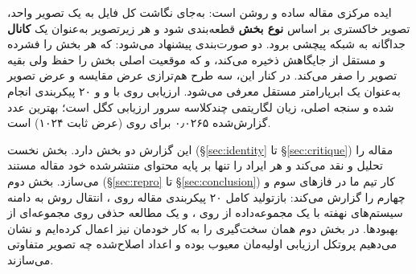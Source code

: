 ایده مرکزی مقاله ساده و روشن است: به‌جای نگاشت کل فایل به یک تصویر واحد، تصویر خاکستری بر اساس \textbf{نوع بخش} قطعه‌بندی شود و هر زیرتصویر به‌عنوان یک \textbf{کانال} جداگانه به شبکه پیچشی برود. دو صورت‌بندی پیشنهاد می‌شود:  که هر بخش را فشرده و مستقل از جایگاهش ذخیره می‌کند، و  که موقعیت اصلی بخش را حفظ ولی بقیه تصویر را صفر می‌کند. در کنار این، سه طرح هم‌ترازی عرض مقایسه و عرض تصویر به‌عنوان یک ابرپارامتر مستقل معرفی می‌شود. ارزیابی روی  با  \cite{simonyan2015vgg} و  \cite{he2016resnet} و ۲۰ پیکربندی انجام شده و سنجه اصلی، زیان لگاریتمی چندکلاسه سرور ارزیابی کگل است؛ بهترین عدد گزارش‌شده \num{۰٫۰۲۶۵} برای  روی  (عرض ثابت \num{۱۰۲۴}) است.

این گزارش دو بخش دارد. بخش نخست (\S\ref{sec:identity} تا \S\ref{sec:critique}) مقاله را تحلیل و نقد می‌کند و هر ایراد را تنها بر پایه محتوای منتشرشده خود مقاله مستند می‌سازد. بخش دوم (\S\ref{sec:repro} تا \S\ref{sec:conclusion}) کار تیم ما در فازهای سوم و چهارم را گزارش می‌کند: بازتولید کامل ۲۰ پیکربندی مقاله روی ، انتقال روش به دامنه سیستم‌های نهفته با یک مجموعه‌داده  از  روی ، و یک مطالعه حذفی روی مجموعه‌ای از بهبود‌ها. در بخش دوم همان سخت‌گیری را به کار خودمان نیز اعمال کرده‌ایم و نشان می‌دهیم پروتکل ارزیابی اولیه‌مان معیوب بوده و اعداد اصلاح‌شده چه تصویر متفاوتی می‌سازند.
